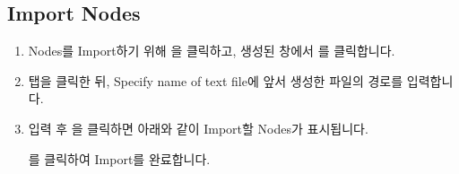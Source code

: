\documentclass[a4paper,11pt,korean,openany,oneside]{sphinxmanual}
\begin{document}
\newpage


\subsection{Import Nodes}
\label{\detokenize{3_import:import-nodes}}
\begin{sphinxShadowBox}
\begin{enumerate}
%
\item {} 
\sphinxAtStartPar
Nodes를 Import하기 위해 을 클릭하고, 생성된 창에서 를 클릭합니다.

\item {} 
\sphinxAtStartPar
{} 탭을 클릭한 뒤, Specify name of text file에 앞서 생성한  파일의 경로를 입력합니다.

\begin{center}
\noindent{}
\end{center}

\newpage

\item {} 
\sphinxAtStartPar
입력 후  \sphinxhyphen{} 을 클릭하면 아래와 같이 Import할 Nodes가 표시됩니다.

\begin{center}
\noindent{}
\end{center}

\sphinxAtStartPar
{}를 클릭하여 Import를 완료합니다.

\end{enumerate}
\end{sphinxShadowBox}
\end{document}
